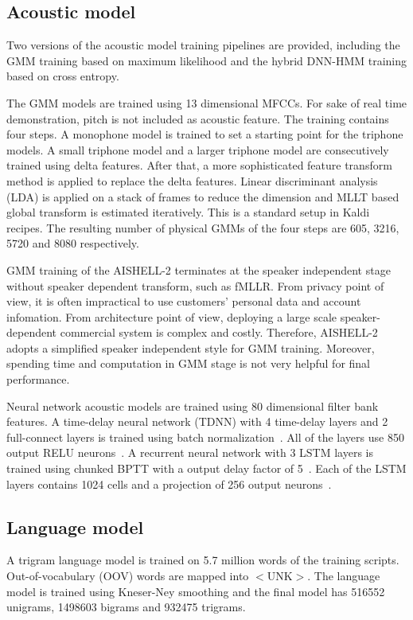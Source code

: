 \documentclass[a4paper]{article}
\begin{document}
\subsection{Acoustic model}

Two versions of the acoustic model training pipelines are provided, including
the GMM training based on maximum likelihood and the hybrid DNN-HMM training
based on cross entropy.

The GMM models are trained using 13 dimensional MFCCs. For sake of real time
demonstration, pitch is not included as acoustic feature. The training contains
four steps. A monophone model is trained to set a starting point for the
triphone models. A small triphone model and a larger triphone model are
consecutively trained using delta features. After that, a more sophisticated
feature transform method is applied to replace the delta features. Linear
discriminant analysis (LDA) is applied on a stack of frames to reduce the
dimension and MLLT based global transform is estimated iteratively. This is a
standard setup in Kaldi recipes. The resulting number of physical GMMs of the
four steps are 605, 3216, 5720 and 8080 respectively.

GMM training of the AISHELL-2 terminates at the speaker independent stage
without speaker dependent transform, such as fMLLR. From privacy point of view,
it is often impractical to use customers' personal data and account
infomation. From architecture point of view, deploying a large scale
speaker-dependent commercial system is complex and costly. Therefore, AISHELL-2
adopts a simplified speaker independent style for GMM training. Moreover,
spending time and computation in GMM stage is not very helpful for final
performance.

Neural network acoustic models are trained using 80 dimensional filter bank
features. A time-delay neural network (TDNN) with 4 time-delay layers and 2
full-connect layers is trained using batch normalization~\cite{tdnn}. All of the
layers use 850 output RELU neurons~\cite{relu}. A recurrent neural network with
3 LSTM layers is trained using chunked BPTT with a output delay factor of
5~\cite{lstm}. Each of the LSTM layers contains 1024 cells and a projection of
256 output neurons~\cite{lstmp}.

\subsection{Language model}

A trigram language model is trained on 5.7 million words of the training
scripts. Out-of-vocabulary (OOV) words are mapped into $<$UNK$>$. The language
model is trained using Kneser-Ney smoothing and the final model has 516552
unigrams, 1498603 bigrams and 932475 trigrams.
\end{document}
